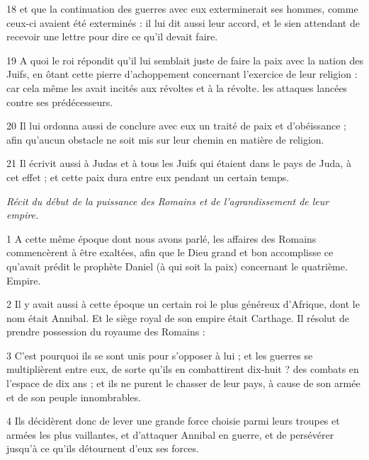 \par 18 et que la continuation des guerres avec eux exterminerait ses hommes, comme ceux-ci avaient été exterminés : il lui dit aussi leur accord, et le sien attendant de recevoir une lettre pour dire ce qu'il devait faire.

\par 19 A quoi le roi répondit qu'il lui semblait juste de faire la paix avec la nation des Juifs, en ôtant cette pierre d'achoppement concernant l'exercice de leur religion : car cela même les avait incités aux révoltes et à la révolte. les attaques lancées contre ses prédécesseurs.

\par 20 Il lui ordonna aussi de conclure avec eux un traité de paix et d'obéissance ; afin qu'aucun obstacle ne soit mis sur leur chemin en matière de religion.

\par 21 Il écrivit aussi à Judas et à tous les Juifs qui étaient dans le pays de Juda, à cet effet ; et cette paix dura entre eux pendant un certain temps.



\par \textit{Récit du début de la puissance des Romains et de l'agrandissement de leur empire.}

\par 1 A cette même époque dont nous avons parlé, les affaires des Romains commencèrent à être exaltées, afin que le Dieu grand et bon accomplisse ce qu'avait prédit le prophète Daniel (à qui soit la paix) concernant le quatrième. Empire.

\par 2 Il y avait aussi à cette époque un certain roi le plus généreux d'Afrique, dont le nom était Annibal. Et le siège royal de son empire était Carthage. Il résolut de prendre possession du royaume des Romains :

\par 3 C'est pourquoi ils se sont unis pour s'opposer à lui ; et les guerres se multiplièrent entre eux, de sorte qu'ils en combattirent dix-huit ? des combats en l’espace de dix ans ; et ils ne purent le chasser de leur pays, à cause de son armée et de son peuple innombrables.

\par 4 Ils décidèrent donc de lever une grande force choisie parmi leurs troupes et armées les plus vaillantes, et d'attaquer Annibal en guerre, et de persévérer jusqu'à ce qu'ils détournent d'eux ses forces.

